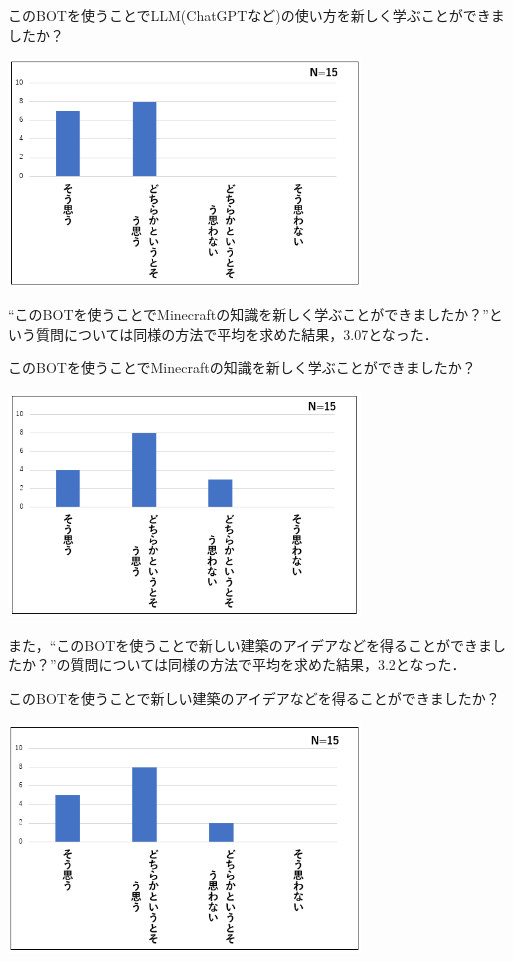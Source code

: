 \begin{table}[H]
    \centering
    \caption{このBOTを使うことでLLM(ChatGPTなど)の使い方を新しく学ぶことができましたか？}
    \label{tab:answer2}
    \includegraphics[width=0.7\textwidth]{fig/tab2.PNG}
\end{table}


``このBOTを使うことでMinecraftの知識を新しく学ぶことができましたか？''という質問については同様の方法で平均を求めた結果，3.07となった．
\begin{table}[H]
    \centering
    \caption{このBOTを使うことでMinecraftの知識を新しく学ぶことができましたか？}
    \label{tab:answer3}
    \includegraphics[width=0.7\textwidth]{fig/tab3.PNG}
\end{table}

また，``このBOTを使うことで新しい建築のアイデアなどを得ることができましたか？''の質問については同様の方法で平均を求めた結果，3.2となった．
\begin{table}[H]
    \centering
    \caption{このBOTを使うことで新しい建築のアイデアなどを得ることができましたか？}
    \label{tab:answer4}
    \includegraphics[width=0.7\textwidth]{fig/tab4.PNG}
\end{table}





